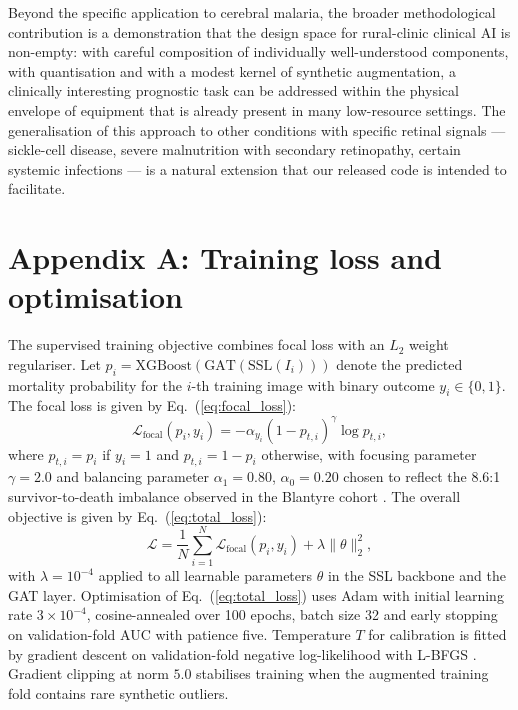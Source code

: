 \documentclass[twocolumn,10pt]{article}
\begin{document}
Beyond the specific application to cerebral malaria, the broader
methodological contribution is a demonstration that the design
space for rural-clinic clinical AI is non-empty: with careful
composition of individually well-understood components, with
quantisation and with a modest kernel of synthetic augmentation,
a clinically interesting prognostic task can be addressed within
the physical envelope of equipment that is already present in
many low-resource settings. The generalisation of this approach
to other conditions with specific retinal signals --- sickle-cell
disease, severe malnutrition with secondary retinopathy, certain
systemic infections --- is a natural extension that our released
code is intended to facilitate.

\section*{Appendix A: Training loss and optimisation}
\label{app:loss}
The supervised training objective combines focal loss
\cite{Lin2017} with an $L_2$ weight regulariser. Let
$p_i = \mathrm{XGBoost}(\mathrm{GAT}(\mathrm{SSL}(I_i)))$ denote
the predicted mortality probability for the $i$-th training
image with binary outcome $y_i\in\{0,1\}$. The focal loss is
given by Eq.~(\ref{eq:focal_loss}):
\begin{equation}
\mathcal{L}_{\mathrm{focal}}(p_i, y_i) =
-\alpha_{y_i}(1-p_{t,i})^{\gamma}\log p_{t,i},
\label{eq:focal_loss}
\end{equation}
where $p_{t,i} = p_i$ if $y_i = 1$ and $p_{t,i} = 1-p_i$
otherwise, with focusing parameter $\gamma = 2.0$ and balancing
parameter $\alpha_1 = 0.80$, $\alpha_0 = 0.20$ chosen to reflect
the 8.6:1 survivor-to-death imbalance observed in the Blantyre
cohort \cite{Beare2006}. The overall objective is given by
Eq.~(\ref{eq:total_loss}):
\begin{equation}
\mathcal{L} = \frac{1}{N}\sum_{i=1}^{N}
\mathcal{L}_{\mathrm{focal}}(p_i, y_i)
+ \lambda \|\theta\|_2^2,
\label{eq:total_loss}
\end{equation}
with $\lambda = 10^{-4}$ applied to all learnable parameters
$\theta$ in the SSL backbone and the GAT layer. Optimisation
of Eq.~(\ref{eq:total_loss}) uses Adam
\cite{Kingma2015Adam} with initial learning rate
$3 \times 10^{-4}$, cosine-annealed over 100 epochs, batch size
32 and early stopping on validation-fold AUC with patience five.
Temperature $T$ for calibration is fitted by gradient descent on
validation-fold negative log-likelihood with L-BFGS
\cite{Guo2017Calibration}. Gradient clipping at norm $5.0$
stabilises training when the augmented training fold contains
rare synthetic outliers.
\end{document}
